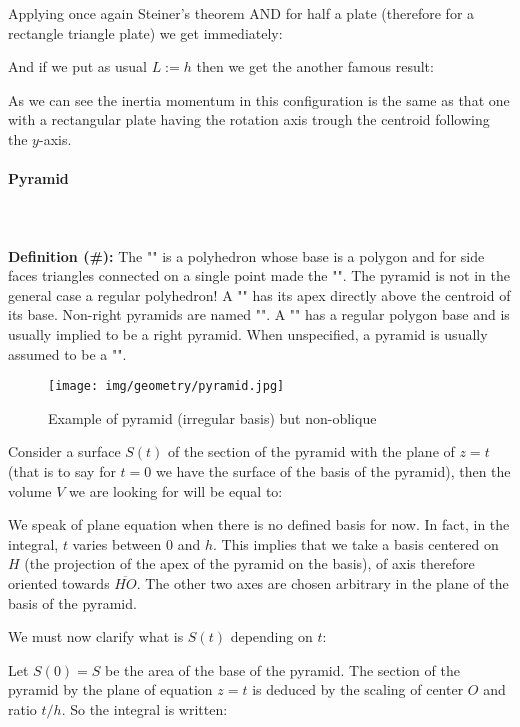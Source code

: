 {	Applying once again Steiner's theorem AND for half a plate (therefore for a rectangle triangle plate) we get immediately:
	
	And if we put as usual $L:=h$ then we get the another famous result:
	
	As we can see the inertia momentum in this configuration is the same as that one with a rectangular plate having the rotation axis trough the centroid following the $y$-axis.
	
	\paragraph{Pyramid}\mbox{}\\\\
	\textbf{Definition (\#\mydef):} The "" is a polyhedron whose base is a polygon and for side faces triangles connected on a single point made the "". The pyramid is not in the general case a regular polyhedron! A "" has its apex directly above the centroid of its base. Non-right pyramids are named "". A "" has a regular polygon base and is usually implied to be a right pyramid. When unspecified, a pyramid is usually assumed to be a "".
	\begin{figure}[H]
		\centering
		\texttt{[image: img/geometry/pyramid.jpg]}
		\caption{Example of pyramid (irregular basis) but non-oblique}
	\end{figure}
	Consider a surface $S(t)$ of the section of the pyramid with the plane of $z=t$ (that is to say for $t=0$ we have the surface of the basis of the pyramid), then the volume $V$ we are looking for will be equal to:
	
	We speak of plane equation when there is no defined basis for now. In fact, in the integral, $t$ varies between $0$ and $h$. This implies that we take a basis centered on $H$ (the projection of the apex of the pyramid on the basis), of axis therefore oriented towards $\overline{HO}$. The other two axes are chosen arbitrary in the plane of the basis of the pyramid.
	
	We must now clarify what is $S(t)$ depending on $t$:
	
	Let $S(0)=S$ be the area of the base of the pyramid. The section of the pyramid by the plane of equation $z=t$ is deduced by the scaling of center $O$ and ratio $t/h$. So the integral is written:
	
}
